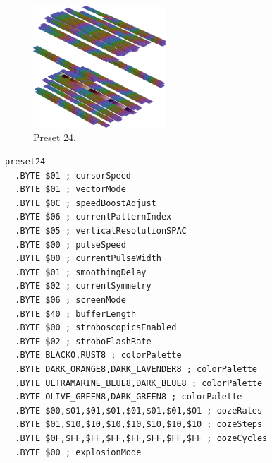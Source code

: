 \clearpage
\begin{minipage}[b]{0.48\linewidth}
\begin{figure}[H]                                                          
  \centering                                                             
  \begin{adjustbox}{width=5cm,center}                                   
  \includegraphics[width=5cm]{src/colorspace_presets/preset24-45.png}%
  \end{adjustbox}                                                        
\caption*{Preset 24.}                                           
\end{figure}                                                               
\end{minipage}
\hspace{0.1cm}
\begin{minipage}[b]{0.48\linewidth}                            
\begin{lstlisting}[basicstyle=\ttfamily\tiny]
preset24
  .BYTE $01 ; cursorSpeed
  .BYTE $01 ; vectorMode
  .BYTE $0C ; speedBoostAdjust
  .BYTE $06 ; currentPatternIndex
  .BYTE $05 ; verticalResolutionSPAC
  .BYTE $00 ; pulseSpeed
  .BYTE $00 ; currentPulseWidth
  .BYTE $01 ; smoothingDelay
  .BYTE $02 ; currentSymmetry
  .BYTE $06 ; screenMode
  .BYTE $40 ; bufferLength
  .BYTE $00 ; stroboscopicsEnabled
  .BYTE $02 ; stroboFlashRate
  .BYTE BLACK0,RUST8 ; colorPalette
  .BYTE DARK_ORANGE8,DARK_LAVENDER8 ; colorPalette
  .BYTE ULTRAMARINE_BLUE8,DARK_BLUE8 ; colorPalette
  .BYTE OLIVE_GREEN8,DARK_GREEN8 ; colorPalette
  .BYTE $00,$01,$01,$01,$01,$01,$01,$01 ; oozeRates
  .BYTE $01,$10,$10,$10,$10,$10,$10,$10 ; oozeSteps
  .BYTE $0F,$FF,$FF,$FF,$FF,$FF,$FF,$FF ; oozeCycles
  .BYTE $00 ; explosionMode
\end{lstlisting}
\end{minipage}

\vspace*{-0.5cm}

